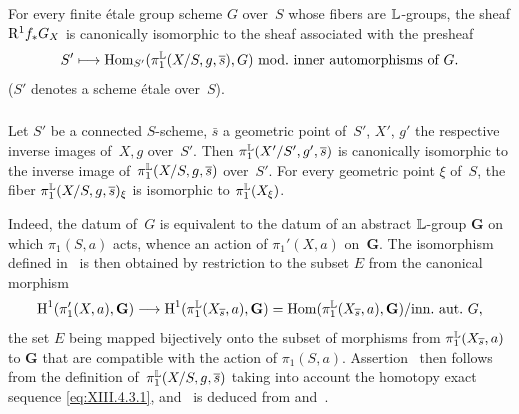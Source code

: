 \subsubsection{}
\label{XIII.4.5.2}
For every finite \'etale group scheme $G$ over~$S$ whose
fibers are $\mathbb{L}$-groups, the sheaf $\mathrm{R}^1f_*G_X$ is
canonically isomorphic to the sheaf associated with the presheaf
$$
S'\mto \Hom_{S'}(\pi_1^\LL(X/S,g,\bar{s}),G)\
\text{mod.\ inner automorphisms of~$G$.}
$$
($S'$ denotes a scheme \'etale over~$S$).

\subsubsection{}
\label{XIII.4.5.3}
Let
$S'$ be a connected
$S$-scheme, $\bar{s}$ a geometric point of~$S'$, $X'$, $g'$
the respective inverse images of~$X,g$ over~$S'$. Then
$\pi_1^{\mathbb{L}}(X'/S',g',\overline{s})$ is canonically isomorphic to
the inverse image of~$\pi_1^{\mathbb{L}}(X/S,g,\overline{s})$ over~$S'$. For every
geometric point $\xi$ of~$S$, the fiber
$\pi_1^{\mathbb{L}}(X/S,g,\overline{s})_\xi$ is isomorphic to $\pi_1^{\mathbb{L}}(X_\xi)$.

Indeed, the datum of~$G$ is equivalent to the datum
of an abstract $\mathbb{L}$-group $\mathbf{G}$
on which $\pi_1(S,a)$ acts, whence an action of
$\pi_1'(X,a)$ on~$\mathbf{G}$. The isomorphism defined
in~ is then obtained by restriction to the subset
$E$ from the canonical morphism
\[
\H^1(\pi_1'(X,a),\mathbf{G})\to
\H^1(\pi_1^\LL(X_{\bar{s}},a),\mathbf{G}) =
\Hom(\pi_1^\LL(X_{\bar{s}},a),\mathbf{G})/\text{inn.\ aut.\ }G,
\]
the set $E$ being mapped bijectively onto the subset of
morphisms from $\pi_1^{\mathbb{L}}(X_{\overline{s}},a)$ to $\mathbf{G}$ that are
compatible with the action of
$\pi_1(S,a)$. Assertion~ then follows from the
definition of~$\pi_1^{\mathbb{L}}(X/S,g,\overline{s})$ taking into account the homotopy
exact sequence \eqref{eq:XIII.4.3.1}, and~\Ref{XIII.4.5.2} is
deduced from  and~.

